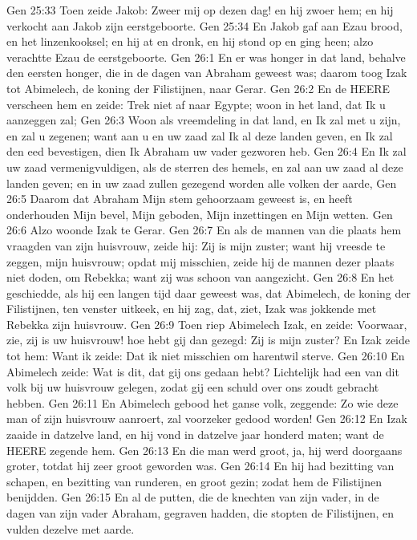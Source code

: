 Gen 25:33  Toen zeide Jakob: Zweer mij op dezen dag! en hij zwoer hem; en hij verkocht aan Jakob zijn eerstgeboorte.
Gen 25:34  En Jakob gaf aan Ezau brood, en het linzenkooksel; en hij at en dronk, en hij stond op en ging heen; alzo verachtte Ezau de eerstgeboorte.
Gen 26:1  En er was honger in dat land, behalve den eersten honger, die in de dagen van Abraham geweest was; daarom toog Izak tot Abimelech, de koning der Filistijnen, naar Gerar.
Gen 26:2  En de HEERE verscheen hem en zeide: Trek niet af naar Egypte; woon in het land, dat Ik u aanzeggen zal;
Gen 26:3  Woon als vreemdeling in dat land, en Ik zal met u zijn, en zal u zegenen; want aan u en uw zaad zal Ik al deze landen geven, en Ik zal den eed bevestigen, dien Ik Abraham uw vader gezworen heb.
Gen 26:4  En Ik zal uw zaad vermenigvuldigen, als de sterren des hemels, en zal aan uw zaad al deze landen geven; en in uw zaad zullen gezegend worden alle volken der aarde,
Gen 26:5  Daarom dat Abraham Mijn stem gehoorzaam geweest is, en heeft onderhouden Mijn bevel, Mijn geboden, Mijn inzettingen en Mijn wetten.
Gen 26:6  Alzo woonde Izak te Gerar.
Gen 26:7  En als de mannen van die plaats hem vraagden van zijn huisvrouw, zeide hij: Zij is mijn zuster; want hij vreesde te zeggen, mijn huisvrouw; opdat mij misschien, zeide hij de mannen dezer plaats niet doden, om Rebekka; want zij was schoon van aangezicht.
Gen 26:8  En het geschiedde, als hij een langen tijd daar geweest was, dat Abimelech, de koning der Filistijnen, ten venster uitkeek, en hij zag, dat, ziet, Izak was jokkende met Rebekka zijn huisvrouw.
Gen 26:9  Toen riep Abimelech Izak, en zeide: Voorwaar, zie, zij is uw huisvrouw! hoe hebt gij dan gezegd: Zij is mijn zuster? En Izak zeide tot hem: Want ik zeide: Dat ik niet misschien om harentwil sterve.
Gen 26:10  En Abimelech zeide: Wat is dit, dat gij ons gedaan hebt? Lichtelijk had een van dit volk bij uw huisvrouw gelegen, zodat gij een schuld over ons zoudt gebracht hebben.
Gen 26:11  En Abimelech gebood het ganse volk, zeggende: Zo wie deze man of zijn huisvrouw aanroert, zal voorzeker gedood worden!
Gen 26:12  En Izak zaaide in datzelve land, en hij vond in datzelve jaar honderd maten; want de HEERE zegende hem.
Gen 26:13  En die man werd groot, ja, hij werd doorgaans groter, totdat hij zeer groot geworden was.
Gen 26:14  En hij had bezitting van schapen, en bezitting van runderen, en groot gezin; zodat hem de Filistijnen benijdden.
Gen 26:15  En al de putten, die de knechten van zijn vader, in de dagen van zijn vader Abraham, gegraven hadden, die stopten de Filistijnen, en vulden dezelve met aarde.
